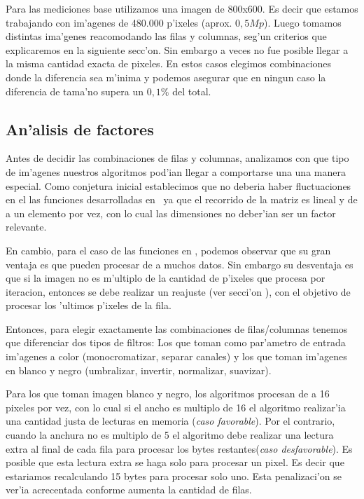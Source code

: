 Para las mediciones base utilizamos una imagen de 800x600. Es decir que estamos trabajando con im'agenes de 480.000 p'ixeles (aprox. $0,5Mp$). Luego tomamos distintas ima'genes reacomodando las filas y columnas, seg'un criterios que explicaremos en la siguiente secc'on. Sin embargo a veces no fue posible llegar a la misma cantidad exacta de pixeles. En estos casos elegimos combinaciones donde la diferencia sea m'inima y podemos asegurar que en ningun caso la diferencia de tama'no supera un $0,1\%$ del total.

\subsection{An'alisis de factores}
Antes de decidir las combinaciones de filas y columnas, analizamos con que tipo de im'agenes nuestros algoritmos pod'ian
llegar a comportarse una una manera especial. Como conjetura inicial establecimos que no deberia haber 
fluctuaciones en el las funciones desarrolladas en \C \ ya que el recorrido de la matriz es lineal y
de a un elemento por vez, con lo cual las dimensiones no deber'ian ser un factor relevante. 

En cambio, para el caso de las funciones en \ass, podemos observar que su gran ventaja es que pueden procesar de a muchos datos. Sin embargo su desventaja es que si la imagen no es m'ultiplo de la cantidad de p'ixeles que procesa por iteracion, entonces se debe realizar un reajuste (ver secci'on \label{sec:ciclos}), con el objetivo de procesar los 'ultimos p'ixeles de la fila.

Entonces, para elegir exactamente las combinaciones de filas/columnas tenemos que diferenciar dos tipos de
filtros: Los que toman como par'ametro de entrada im'agenes a color (monocromatizar, separar canales) y los que toman im'agenes en blanco y negro
(umbralizar, invertir, normalizar, suavizar).

Para los que toman imagen blanco y negro, los algoritmos procesan de a 16 pixeles por vez, con lo cual si el ancho es multiplo de 16 el algoritmo realizar'ia una cantidad justa de lecturas en memoria (\textit{caso favorable}). Por el contrario, cuando la anchura no es multiplo de 5 el algoritmo debe realizar una lectura extra al final de cada fila para procesar los bytes restantes(\textit{caso desfavorable}). Es posible que esta lectura extra se haga solo para procesar un pixel. Es decir que estariamos recalculando 15 bytes para procesar solo uno. Esta penalizaci'on se ver'ia acrecentada conforme aumenta la cantidad de filas.

